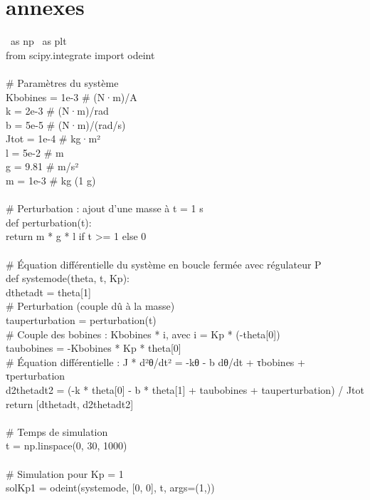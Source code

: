 \documentclass[letterpaper,12pt]{article}
\begin{document}
\section{annexes}
\ as np
\ as plt
\\from scipy.integrate import odeint
\\
\\# Paramètres du système
\\Kbobines = 1e-3  # (N·m)/A
\\k = 2e-3          # (N·m)/rad
\\b = 5e-5          # (N·m)/(rad/s)
\\Jtot = 1e-4      # kg·m²
\\l = 5e-2          # m
\\g = 9.81          # m/s²
\\m = 1e-3          # kg (1 g)
\\
\\# Perturbation : ajout d'une masse à t = 1 s
\\def perturbation(t):
\\    return m * g * l if t >= 1 else 0
\\
\\# Équation différentielle du système en boucle fermée avec régulateur P
\\def systemode(theta, t, Kp):
\\    dthetadt = theta[1]
\\    # Perturbation (couple dû à la masse)
\\    tauperturbation = perturbation(t)
\\    # Couple des bobines : Kbobines * i, avec i = Kp * (-theta[0])
\\    taubobines = -Kbobines * Kp * theta[0]
\\    # Équation différentielle : J * d²θ/dt² = -kθ - b dθ/dt + τbobines + τperturbation
\\    d2thetadt2 = (-k * theta[0] - b * theta[1] + taubobines + tauperturbation) / Jtot
\\    return [dthetadt, d2thetadt2]
\\
\\# Temps de simulation
\\t = np.linspace(0, 30, 1000)
\\
\\# Simulation pour Kp = 1
\\solKp1 = odeint(systemode, [0, 0], t, args=(1,))
\end{document}
